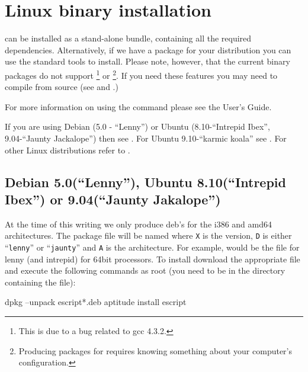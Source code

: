 %
%
%

\section{Linux binary installation}
\label{sec:binlinux}

\esfinley can be installed as a stand-alone bundle, containing all the required dependencies.
Alternatively, if we have a package for your distribution you can use the standard tools to install.
Please note, however, that the current binary packages do not support \openmp\footnote{This is due to a bug related to gcc 4.3.2.} or \mpi\footnote{Producing packages for \mpi requires knowing something about your computer's configuration.}.
If you need these features you may need to compile \esfinley from source (see  and .)

For more information on using the  command please see the User's Guide.

If you are using Debian (5.0 - ``Lenny'') or Ubuntu (8.10-``Intrepid Ibex'', 9.04-``Jaunty Jackalope'') then see .
For Ubuntu 9.10-``karmic koala'' see .
For other Linux distributions refer to .

\subsection{Debian 5.0(``Lenny''), Ubuntu 8.10(``Intrepid Ibex'') or 9.04(``Jaunty Jakalope'')}\label{sec:debian}

At the time of this writing we only produce deb's for the i386 and amd64 architectures.
The package file will be named  where \texttt{X} is the version, \texttt{D} is either ``\texttt{lenny}'' or ``\texttt{jaunty}'' and \texttt{A} is the architecture.
For example,  would be the file for lenny (and intrepid) for 64bit processors.
To install \esfinley download the appropriate  file and execute the following commands as root (you need to be in the directory containing the file):
\begin{shellCode}
dpkg --unpack escript*.deb
aptitude install escript
\end{shellCode}

